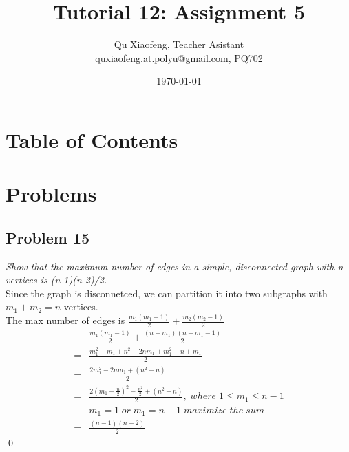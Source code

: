 \documentclass[
        ]{beamer}
\title[Tutorial 12]{Tutorial 12: Assignment 5}
\author[COMP210]{Qu Xiaofeng\texorpdfstring{, Teacher Asistant\\\tiny{quxiaofeng.at.polyu@gmail.com, PQ702}}{}}
\institute{COMP210\\Discrete Structure}
\date{\today}
\begin{document}
\frame{\titlepage}

\section*{Table of Contents}

    \begin{frame}{\secname}
        \tableofcontents
    \end{frame}

   
\section{Problems}
    \subsection{Problem 15}
        \begin{frame}[c]{\subsecname}
            \emph{Show that the maximum number of edges in a simple, disconnected graph with n
vertices is (n-1)(n-2)/2.}\\\pause
            Since the graph is disconnetced, we can partition it into two subgraphs with $m_1+m_2=n$ vertices.\\
            The max number of edges is $\frac{m_1(m_1-1)}{2}+\frac{m_2(m_2-1)}{2}$
            \begin{align*}
             &\frac{m_1(m_1-1)}{2}+\frac{(n-m_1)(n-m_1-1)}{2}\\
            =&\frac{m_1^2-m_1+n^2-2nm_1+m_1^2-n+m_1}{2}\\
            =&\frac{2m_1^2-2nm_1+(n^2-n)}{2}\\
            =&\frac{2(m_1-\frac{n}{2})^2-\frac{n^2}{2}+(n^2-n)}{2},\; where\; 1\leq m_1 \leq n-1\\
             & m_1=1\; or \; m_1=n-1\; maximize\; the\; sum\\
            =&\frac{(n-1)(n-2)}{2}
            \end{align*}\qed
        \end{frame}
\end{document}

